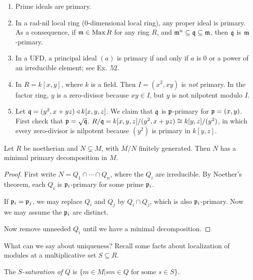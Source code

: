  \setcounter{lecture}{13}

 \begin{example}
  \begin{enumerate}
   \item Prime ideals are primary.

   \item In a rad-nil local ring (0-dimensional local ring), any proper ideal is primary.
   As a consequence, if $\mathfrak{m}\in \operatorname{Max} R$ for any ring $R$, and $\mathfrak{m}^n\subseteq \mathfrak{q}\subseteq
   \mathfrak{m}$, then $\mathfrak{q}$ is $\mathfrak{m}$-primary.

   \item In a UFD, a principal ideal $(a)$ is primary if and only if $a$ is 0 or a power
   of an irreducible element; see Ex.\ 52.

   \item In $R=k[x,y]$, where $k$ is a field. Then $I=(x^2,xy)$ is \emph{not} primary. In
   the factor ring, $y$ is a zero-divisor because $xy\in I$, but $y$ is not nilpotent
   modulo $I$.

   \item Let $\mathfrak{q}=(y^2,x+yz)\triangleleft k[x,y,z]$. We claim that $\mathfrak{q}$ is $\mathfrak{p}$-primary for
   $\mathfrak{p}=(x,y)$. First check that $\mathfrak{p}=\sqrt {\mathfrak{q}}$. $R/\mathfrak{q} = k[x,y,z]/(y^2,x+yz)\cong
   k[y,z]/(y^2)$, in which every zero-divisor is nilpotent because $(y^2)$ is primary in
   $k[y,z]$.
  \end{enumerate}
  \vspace*{-1.7\baselineskip}
 \end{example}
 \begin{theorem}
   Let $R$ be noetherian and $N\subsetneq M$, with $M/N$ finitely generated. Then $N$ has
   a minimal primary decomposition in $M$.
 \end{theorem}
 \begin{proof}
   First write $N=Q_1\cap \cdots \cap Q_n$, where the $Q_i$ are irreducible. By Noether's
   theorem, each $Q_i$ is $\mathfrak{p}_i$-primary for some prime $\mathfrak{p}_i$.

   If $\mathfrak{p}_i=\mathfrak{p}_j$, we may replace $Q_i$ and $Q_j$ by $Q_i\cap Q_j$, which is also
   $\mathfrak{p}_i$-primary. Now we may assume the $\mathfrak{p}_i$ are distinct.

   Now remove unneeded $Q_i$ until we have a minimal decomposition.
 \end{proof}
 What can we say about uniqueness? Recall some facts about localization of modules at a
 multiplicative set $S\subseteq R$.
 \begin{definition}
   The \emph{$S$-saturation of $Q$} is $\{m\in M|sm\in Q\text{ for some }s\in S\}$.
 \end{definition}

